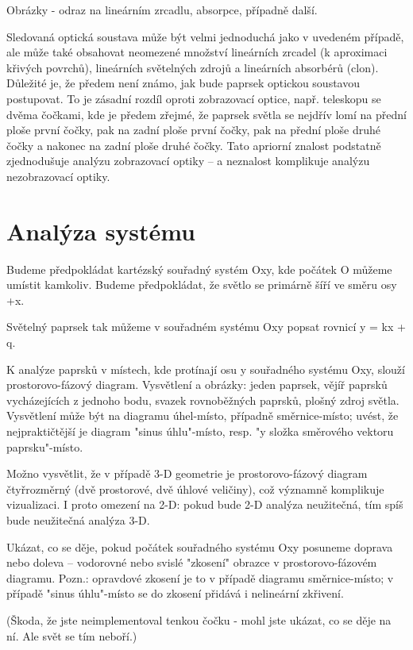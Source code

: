 Obrázky - odraz na lineárním zrcadlu, absorpce, případně další.

Sledovaná optická soustava může být velmi jednoduchá jako v uvedeném
případě, ale může také obsahovat neomezené množství lineárních zrcadel
(k aproximaci křivých povrchů), lineárních světelných zdrojů a
lineárních absorbérů (clon). Důležité je, že předem není známo, jak bude
paprsek optickou soustavou postupovat. To je zásadní rozdíl oproti
zobrazovací optice, např. teleskopu se dvěma čočkami, kde je předem
zřejmé, že paprsek světla se nejdřív lomí na přední ploše první čočky,
pak na zadní ploše první čočky, pak na přední ploše druhé čočky a
nakonec na zadní ploše druhé čočky. Tato apriorní znalost podstatně
zjednodušuje analýzu zobrazovací optiky -- a neznalost komplikuje
analýzu nezobrazovací optiky.



\section{Analýza systému}

Budeme předpokládat kartézský souřadný systém Oxy, kde počátek O můžeme
umístit kamkoliv. Budeme předpokládat, že světlo se primárně šíří ve
směru osy +x.

Světelný paprsek tak můžeme v souřadném systému Oxy popsat rovnicí
   y = kx + q.

K analýze paprsků v místech, kde protínají osu y souřadného systému Oxy,
slouží prostorovo-fázový diagram. Vysvětlení a obrázky: jeden paprsek,
vějíř paprsků vycházejících z jednoho bodu, svazek rovnoběžných paprsků,
plošný zdroj světla. Vysvětlení může být na diagramu úhel-místo,
případně směrnice-místo; uvést, že nejpraktičtější je diagram "sinus
úhlu"-místo, resp. "y složka směrového vektoru paprsku"-místo.

Možno vysvětlit, že v případě 3-D geometrie je prostorovo-fázový diagram
čtyřrozměrný (dvě prostorové, dvě úhlové veličiny), což významně
komplikuje vizualizaci. I proto omezení na 2-D: pokud bude 2-D analýza
neužitečná, tím spíš bude neužitečná analýza 3-D.

Ukázat, co se děje, pokud počátek souřadného systému Oxy posuneme
doprava nebo doleva -- vodorovné nebo svislé "zkosení" obrazce v
prostorovo-fázovém diagramu. Pozn.: opravdové zkosení je to v případě
diagramu směrnice-místo; v případě "sinus úhlu"-místo se do zkosení
přidává i nelineární zkřivení.

(Škoda, že jste neimplementoval tenkou čočku - mohl jste ukázat, co se
děje na ní. Ale svět se tím neboří.)

